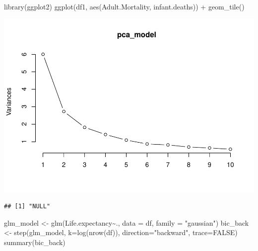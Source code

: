 \documentclass[
]{article}
\newenvironment{Shaded}{\begin{snugshade}}{\end{snugshade}}
\newcommand{\AttributeTok}[1]{\textcolor[rgb]{0.77,0.63,0.00}{#1}}
\newcommand{\CommentTok}[1]{\textcolor[rgb]{0.56,0.35,0.01}{\textit{#1}}}
\newcommand{\ConstantTok}[1]{\textcolor[rgb]{0.00,0.00,0.00}{#1}}
\newcommand{\FunctionTok}[1]{\textcolor[rgb]{0.00,0.00,0.00}{#1}}
\newcommand{\NormalTok}[1]{#1}
\newcommand{\OtherTok}[1]{\textcolor[rgb]{0.56,0.35,0.01}{#1}}
\newcommand{\SpecialCharTok}[1]{\textcolor[rgb]{0.00,0.00,0.00}{#1}}
\newcommand{\StringTok}[1]{\textcolor[rgb]{0.31,0.60,0.02}{#1}}
\begin{document}
\begin{Shaded}
\begin{Highlighting}[]
\FunctionTok{library}\NormalTok{(ggplot2)}
\FunctionTok{ggplot}\NormalTok{(df1, }\FunctionTok{aes}\NormalTok{(Adult.Mortality, infant.deaths)) }\SpecialCharTok{+} 
  \FunctionTok{geom\_tile}\NormalTok{()}
\end{Highlighting}
\end{Shaded}

\includegraphics{583Project_files/figure-latex/unnamed-chunk-25-1.pdf}

\begin{Shaded}
\end{Shaded}

\begin{verbatim}
## [1] "NULL"
\end{verbatim}

\begin{Shaded}
\begin{Highlighting}[]
\NormalTok{glm\_model }\OtherTok{\textless{}{-}} \FunctionTok{glm}\NormalTok{(Life.expectancy}\SpecialCharTok{\textasciitilde{}}\NormalTok{., }\AttributeTok{data =}\NormalTok{ df, }\AttributeTok{family =} \StringTok{"gaussian"}\NormalTok{)}
\NormalTok{bic\_back }\OtherTok{\textless{}{-}} \FunctionTok{step}\NormalTok{(glm\_model, }\AttributeTok{k=}\FunctionTok{log}\NormalTok{(}\FunctionTok{nrow}\NormalTok{(df)), }\AttributeTok{direction=}\StringTok{"backward"}\NormalTok{, }\AttributeTok{trace=}\ConstantTok{FALSE}\NormalTok{)}
\FunctionTok{summary}\NormalTok{(bic\_back)}
\end{Highlighting}
\end{Shaded}
\end{document}
